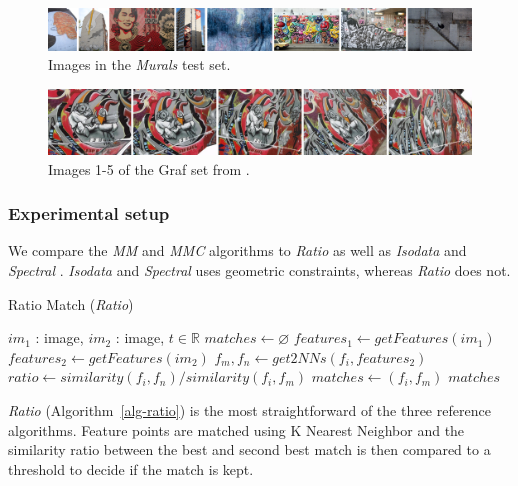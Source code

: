 \documentclass{article}
\begin{document}
\begin{figure}[t]
	\centering
	\includegraphics[width=\textwidth]{images/murals}
	\caption{Images in the \emph{Murals} test set.}
	\label{fig:murals}
\end{figure}

\begin{figure}[htb]
	\centering
	\includegraphics[width=\columnwidth]{images/graf12345.jpg}
	\caption{Images 1-5 of the Graf set from \cite{mikolajczyk2005performance}.}
	\label{fig:Graf}
\end{figure}


\subsubsection{Experimental setup}
We compare the \emph{MM} and \emph{MMC} algorithms to \emph{Ratio} 
\cite{lowe2004sift} as well as \emph{Isodata} \cite{das2008event} and 
\emph{Spectral} \cite{leordeanu2005spectral}.  \emph{Isodata} and 
\emph{Spectral} uses geometric constraints, whereas \emph{Ratio} does 
not.

\begin{algorithm}
\caption{Ratio Match (\emph{Ratio})}
\label{alg-ratio}
\begin{algorithmic}
\Require $im_1$ : image, $im_2$ : image, $t \in \mathbb{R}$
\State $matches\gets \varnothing$
\State $features_1 \gets getFeatures(im_1)$
\State $features_2 \gets getFeatures(im_2)$
    \State $f_m,f_n \gets get2NNs(f_i, features_2)$
	\State $ratio \gets similarity(f_i, f_n) / similarity(f_i, f_m)$
        \State $matches \gets \left(f_i, f_m\right)$
	\EndIf
\EndFor
\Return $matches$
\end{algorithmic}
\end{algorithm}

\emph{Ratio} (Algorithm~\ref{alg-ratio}) \cite{lowe2004sift} is the most 
straightforward of the three reference algorithms. Feature points are 
matched using K Nearest Neighbor and the similarity ratio between the 
best and second best match is then compared to a threshold to decide if 
the match is kept.
\end{document}
